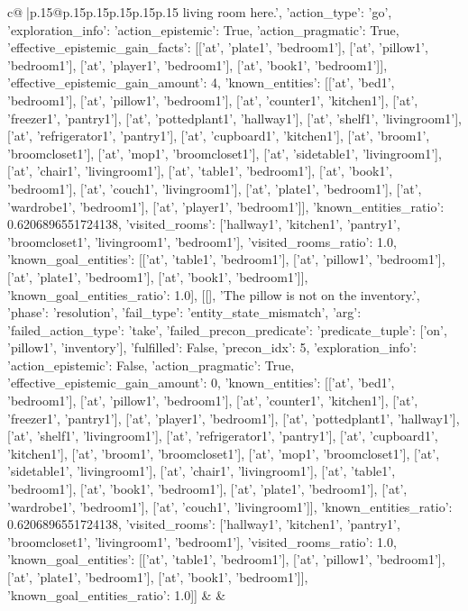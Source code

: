 \documentclass{article}
\begin{document}
{\begin{supertabular}{c@{$\;$}|p{.15\linewidth}@{}p{.15\linewidth}p{.15\linewidth}p{.15\linewidth}p{.15\linewidth}p{.15\linewidth}}
{{{living room here.', {'action_type': 'go', 'exploration_info': {'action_epistemic': True, 'action_pragmatic': True, 'effective_epistemic_gain_facts': [['at', 'plate1', 'bedroom1'], ['at', 'pillow1', 'bedroom1'], ['at', 'player1', 'bedroom1'], ['at', 'book1', 'bedroom1']], 'effective_epistemic_gain_amount': 4, 'known_entities': [['at', 'bed1', 'bedroom1'], ['at', 'pillow1', 'bedroom1'], ['at', 'counter1', 'kitchen1'], ['at', 'freezer1', 'pantry1'], ['at', 'pottedplant1', 'hallway1'], ['at', 'shelf1', 'livingroom1'], ['at', 'refrigerator1', 'pantry1'], ['at', 'cupboard1', 'kitchen1'], ['at', 'broom1', 'broomcloset1'], ['at', 'mop1', 'broomcloset1'], ['at', 'sidetable1', 'livingroom1'], ['at', 'chair1', 'livingroom1'], ['at', 'table1', 'bedroom1'], ['at', 'book1', 'bedroom1'], ['at', 'couch1', 'livingroom1'], ['at', 'plate1', 'bedroom1'], ['at', 'wardrobe1', 'bedroom1'], ['at', 'player1', 'bedroom1']], 'known_entities_ratio': 0.6206896551724138, 'visited_rooms': ['hallway1', 'kitchen1', 'pantry1', 'broomcloset1', 'livingroom1', 'bedroom1'], 'visited_rooms_ratio': 1.0, 'known_goal_entities': [['at', 'table1', 'bedroom1'], ['at', 'pillow1', 'bedroom1'], ['at', 'plate1', 'bedroom1'], ['at', 'book1', 'bedroom1']], 'known_goal_entities_ratio': 1.0}}], [[], 'The pillow is not on the inventory.', {'phase': 'resolution', 'fail_type': 'entity_state_mismatch', 'arg': {'failed_action_type': 'take', 'failed_precon_predicate': {'predicate_tuple': ['on', 'pillow1', 'inventory'], 'fulfilled': False, 'precon_idx': 5}}, 'exploration_info': {'action_epistemic': False, 'action_pragmatic': True, 'effective_epistemic_gain_amount': 0, 'known_entities': [['at', 'bed1', 'bedroom1'], ['at', 'pillow1', 'bedroom1'], ['at', 'counter1', 'kitchen1'], ['at', 'freezer1', 'pantry1'], ['at', 'player1', 'bedroom1'], ['at', 'pottedplant1', 'hallway1'], ['at', 'shelf1', 'livingroom1'], ['at', 'refrigerator1', 'pantry1'], ['at', 'cupboard1', 'kitchen1'], ['at', 'broom1', 'broomcloset1'], ['at', 'mop1', 'broomcloset1'], ['at', 'sidetable1', 'livingroom1'], ['at', 'chair1', 'livingroom1'], ['at', 'table1', 'bedroom1'], ['at', 'book1', 'bedroom1'], ['at', 'plate1', 'bedroom1'], ['at', 'wardrobe1', 'bedroom1'], ['at', 'couch1', 'livingroom1']], 'known_entities_ratio': 0.6206896551724138, 'visited_rooms': ['hallway1', 'kitchen1', 'pantry1', 'broomcloset1', 'livingroom1', 'bedroom1'], 'visited_rooms_ratio': 1.0, 'known_goal_entities': [['at', 'table1', 'bedroom1'], ['at', 'pillow1', 'bedroom1'], ['at', 'plate1', 'bedroom1'], ['at', 'book1', 'bedroom1']], 'known_goal_entities_ratio': 1.0}}]] 
	  } 
	   } 
	   } 
	 & & \\ 
 


\end{supertabular}}
\end{document}
